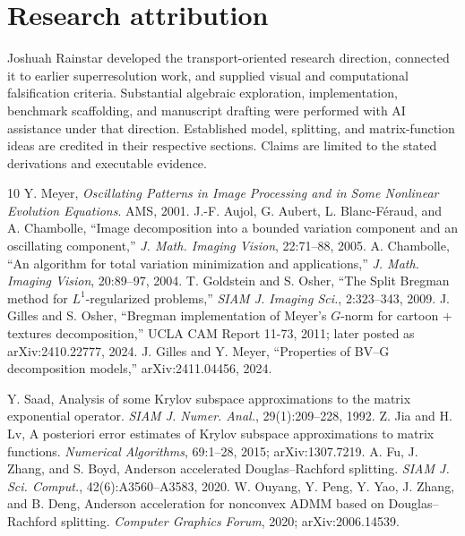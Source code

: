 \documentclass[10pt,twocolumn]{article}
\theoremstyle{definition}\newtheorem{remark}[proposition]{Remark}
\begin{document}
\section*{Research attribution}
Joshuah Rainstar developed the transport-oriented research direction,
connected it to earlier superresolution work, and supplied visual and
computational falsification criteria. Substantial algebraic exploration,
implementation, benchmark scaffolding, and manuscript drafting were
performed with AI assistance under that direction. Established model,
splitting, and matrix-function ideas are credited in their respective
sections. Claims are limited to the stated derivations and executable
evidence.
\begin{thebibliography}{10}
\small
{} Y. Meyer, \emph{Oscillating Patterns in Image Processing
and in Some Nonlinear Evolution Equations}. AMS, 2001.
 J.-F. Aujol, G. Aubert, L. Blanc-F\'eraud, and A.
Chambolle, ``Image decomposition into a bounded variation component and an
oscillating component,'' \emph{J. Math. Imaging Vision}, 22:71--88, 2005.
 A. Chambolle, ``An algorithm for total variation
minimization and applications,'' \emph{J. Math. Imaging Vision}, 20:89--97,
2004.
 T. Goldstein and S. Osher, ``The Split Bregman method
for $L^1$-regularized problems,'' \emph{SIAM J. Imaging Sci.}, 2:323--343,
2009.
 J. Gilles and S. Osher, ``Bregman implementation of
Meyer's $G$-norm for cartoon + textures decomposition,'' UCLA CAM Report 11-73, 2011; later posted as arXiv:2410.22777, 2024.
 J. Gilles and Y. Meyer, ``Properties of BV--G
decomposition models,'' arXiv:2411.04456, 2024.

 Y. Saad, Analysis of some Krylov subspace approximations
to the matrix exponential operator. \emph{SIAM J. Numer. Anal.},
29(1):209--228, 1992.
 Z. Jia and H. Lv, A posteriori error estimates of Krylov
subspace approximations to matrix functions. \emph{Numerical Algorithms},
69:1--28, 2015; arXiv:1307.7219.
 A. Fu, J. Zhang, and S. Boyd, Anderson accelerated
Douglas--Rachford splitting. \emph{SIAM J. Sci. Comput.},
42(6):A3560--A3583, 2020.
 W. Ouyang, Y. Peng, Y. Yao, J. Zhang, and B. Deng,
Anderson acceleration for nonconvex ADMM based on Douglas--Rachford
splitting. \emph{Computer Graphics Forum}, 2020; arXiv:2006.14539.
\end{thebibliography}
\end{document}

